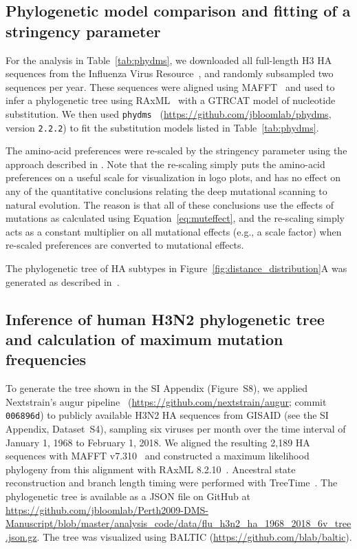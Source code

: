\documentclass[9pt,twoside,lineno]{pnas-new}
\begin{document}
\subsection*{Phylogenetic model comparison and fitting of a stringency parameter}
For the analysis in Table~\ref{tab:phydms}, we downloaded all full-length H3 HA sequences from the Influenza Virus Resource~\cite{bao2008}, and randomly subsampled two sequences per year.
These sequences were aligned using MAFFT~\cite{katoh2013mafft} and used to infer a phylogenetic tree using RAxML~\cite{stamatakis2006raxml} with a GTRCAT model of nucleotide substitution.
We then used \texttt{phydms}~\cite{hilton2017phydms} (\url{https://github.com/jbloomlab/phydms}, version \texttt{2.2.2}) to fit the substitution models listed in Table~\ref{tab:phydms}.

The amino-acid preferences were re-scaled by the stringency parameter using the approach described in \cite{hilton2017phydms}.
Note that the re-scaling simply puts the amino-acid preferences on a useful scale for visualization in logo plots, and has no effect on any of the quantitative conclusions relating the deep mutational scanning to natural evolution.
The reason is that all of these conclusions use the effects of mutations as calculated using Equation~\ref{eq:muteffect}, and the re-scaling simply acts as a constant multiplier on all mutational effects (e.g., a scale factor) when re-scaled preferences are converted to mutational effects.

The phylogenetic tree of HA subtypes in Figure~\ref{fig:distance_distribution}A was generated as described in~\cite{doud2018quantifying}.

\subsection*{Inference of human H3N2 phylogenetic tree and calculation of maximum mutation frequencies}
To generate the tree shown in the SI Appendix (Figure~S8), we applied Nextstrain's augur pipeline~\cite{Hadfield224048} (\url{https://github.com/nextstrain/augur}; commit \texttt{006896d}) to publicly available H3N2 HA sequences from GISAID \cite{shu2017gisaid} (see the SI Appendix, Dataset~S4), sampling six viruses per month over the time interval of January 1, 1968 to February 1, 2018.
We aligned the resulting 2,189 HA sequences with MAFFT v7.310~\cite{katoh2013mafft} and constructed a maximum likelihood phylogeny from this alignment with RAxML 8.2.10~\cite{stamatakis2006raxml}.
Ancestral state reconstruction and branch length timing were performed with TreeTime~\cite{Sagulenko2018}.
The phylogenetic tree is available as a JSON file on GitHub at \url{https://github.com/jbloomlab/Perth2009-DMS-Manuscript/blob/master/analysis_code/data/flu_h3n2_ha_1968_2018_6v_tree.json.gz}.
The tree was visualized using BALTIC (\url{https://github.com/blab/baltic}).
\end{document}
